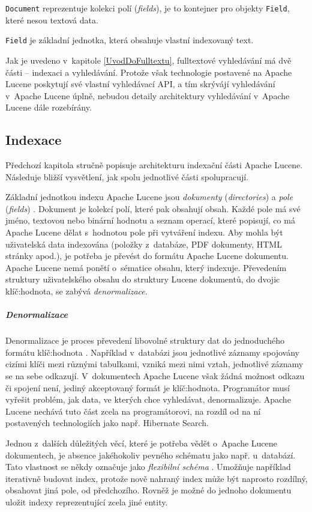 \documentclass[11pt,oneside]{fithesis2}
\begin{document}
\texttt{Document} reprezentuje kolekci polí (\emph{fields}), je to kontejner pro objekty \texttt{Field}, které nesou textová data. 

\texttt{Field} je základní jednotka, která obsahuje vlastní indexovaný text.

Jak je uvedeno v~kapitole \ref{UvodDoFulltextu}, fulltextové vyhledávání má dvě části -- indexaci a vyhledávání. Protože však technologie postavené na Apache Lucene poskytují své vlastní vyhledávací API, a tím skrývájí vyhledávání v~Apache Lucene úplně, nebudou detaily architektury vyhledávání v~Apache Lucene dále rozebírány. 

\subsection{Indexace}
Předchozí kapitola stručně popisuje architekturu indexační části Apache Lucene. Následuje bližší vysvětlení, jak spolu jednotlivé části spolupracují.

Základní jednotkou indexu Apache Lucene jsou \emph{dokumenty} (\emph{directories}) a \emph{pole} (\emph{fields}) \cite[s.~32]{LuceneAction}. Dokument je kolekcí polí, které pak obsahují  obsah. Každé pole má své jméno, textovou nebo binární hodnotu a seznam operací, které popisují, co má Apache Lucene dělat s~hodnotou pole při vytváření indexu. Aby mohla být uživatelská data indexována (položky z~databáze, PDF dokumenty, HTML stránky apod.), je potřeba je převést do formátu Apache Lucene dokumentu. Apache Lucene nemá ponětí o~sématice obsahu, který indexuje. Převedením struktury uživatelského obsahu do struktury Lucene dokumentů, do dvojic klíč:hodnota, se zabývá \emph{denormalizace}.

\subparagraph{Denormalizace}
\label{Denormalizace}
Denormalizace je proces převedení libovolné struktury dat do jednoduchého formátu klíč:hodnota \cite[s.~34]{LuceneAction}. Například v~databázi jsou jednotlivé záznamy spojovány cizími klíči mezi různými tabulkami, vzniká mezi nimi vztah, jednotlivé záznamy se na sebe odkazují. V~dokumentech Apache Lucene však žádná možnost odkazu či spojení není, jediný akceptovaný formát je klíč:hodnota. Programátor musí vyřešit problém, jak data, ve kterých chce vyhledávat, denormalizuje. Apache Lucene nechává tuto část zcela na programátorovi, na rozdíl od na ní postavených technologiích jako např. Hibernate Search.

Jednou z~dalších důležitých věcí, které je potřeba vědět o~Apache Lucene dokumentech, je absence jakéhokoliv pevného schématu jako např. u~databází. Tato vlastnost se někdy označuje jako \emph{flexibilní schéma} \cite[s.~34]{LuceneAction}. Umožňuje například iterativně budovat index, protože nově nahraný index může být naprosto rozdílný, obsahovat jiná pole, od předchozího. Rovněž je možné do jednoho dokumentu uložit indexy reprezentující zcela jiné entity.
\end{document}
